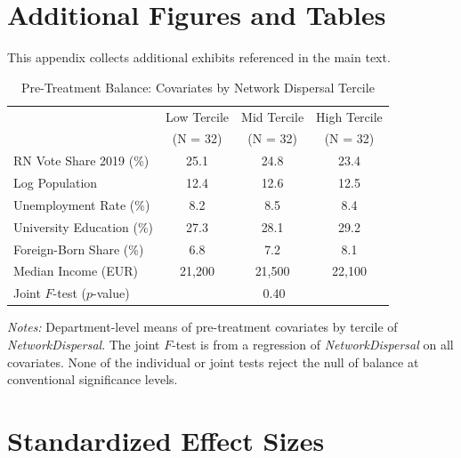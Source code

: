 \documentclass[12pt]{article}
\begin{document}
\section{Additional Figures and Tables}
\label{app:exhibits}

This appendix collects additional exhibits referenced in the main text.

\begin{table}[H]
\centering
\caption{Pre-Treatment Balance: Covariates by Network Dispersal Tercile}
\label{tab:balance}
\begin{tabular}{lccc}
\toprule
 & Low Tercile & Mid Tercile & High Tercile \\
 & (N = 32) & (N = 32) & (N = 32) \\
\midrule
RN Vote Share 2019 (\%) & 25.1 & 24.8 & 23.4 \\
Log Population & 12.4 & 12.6 & 12.5 \\
Unemployment Rate (\%) & 8.2 & 8.5 & 8.4 \\
University Education (\%) & 27.3 & 28.1 & 29.2 \\
Foreign-Born Share (\%) & 6.8 & 7.2 & 8.1 \\
Median Income (EUR) & 21,200 & 21,500 & 22,100 \\
\midrule
Joint $F$-test ($p$-value) & \multicolumn{3}{c}{0.40} \\
\bottomrule
\end{tabular}
\begin{minipage}{0.92\textwidth}
\small\textit{Notes:} Department-level means of pre-treatment covariates by tercile of \textit{NetworkDispersal}. The joint $F$-test is from a regression of \textit{NetworkDispersal} on all covariates. None of the individual or joint tests reject the null of balance at conventional significance levels.
\end{minipage}
\end{table}

\section{Standardized Effect Sizes}
\label{sec:sde}
\end{document}
